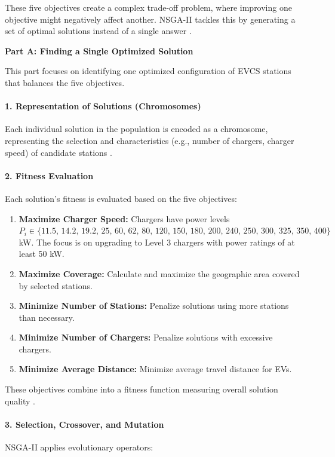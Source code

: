 These five objectives create a complex trade-off problem, where improving one objective might negatively affect another. NSGA-II tackles this by generating a set of optimal solutions instead of a single answer \cite{A_Fast_and_Elitist_Multi_objective_Genetic_Algorithm_NSGA_II}.

\bigskip
\textbf{Part A: Finding a Single Optimized Solution}

This part focuses on identifying one optimized configuration of EVCS stations that balances the five objectives.

\paragraph{1. Representation of Solutions (Chromosomes)}  
Each individual solution in the population is encoded as a chromosome, representing the selection and characteristics (e.g., number of chargers, charger speed) of candidate stations \cite{Introduction_to_evolutionary_computing}.

\paragraph{2. Fitness Evaluation}  
Each solution’s fitness is evaluated based on the five objectives:

\begin{enumerate}
    \item \textbf{Maximize Charger Speed:} Chargers have power levels \( P_i \in \{11.5,\, 14.2,\, 19.2,\, 25,\, 60,\, 62,\, 80,\, 120,\, 150,\, 180,\, 200,\, 240,\, 250,\, 300,\, 325,\, 350,\, 400\} \) kW. The focus is on upgrading to Level 3 chargers with power ratings of at least 50 kW.    
    \item \textbf{Maximize Coverage:} Calculate and maximize the geographic area covered by selected stations.
    \item \textbf{Minimize Number of Stations:} Penalize solutions using more stations than necessary.
    \item \textbf{Minimize Number of Chargers:} Penalize solutions with excessive chargers.
    \item \textbf{Minimize Average Distance:} Minimize average travel distance for EVs.
\end{enumerate}

These objectives combine into a fitness function measuring overall solution quality \cite{Introduction_to_evolutionary_computing}.

\paragraph{3. Selection, Crossover, and Mutation}  
NSGA-II applies evolutionary operators:

